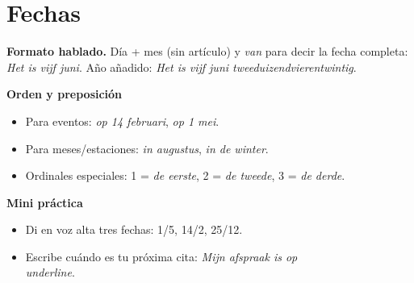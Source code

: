 \section{Fechas}
\textbf{Formato hablado.} Día + mes (sin artículo) y \textit{van} para decir la fecha completa: \textit{Het is vijf juni}. Año añadido: \textit{Het is vijf juni tweeduizendvierentwintig}.

\textbf{Orden y preposición}
\begin{itemize}[leftmargin=*]
  \item Para eventos: \textit{op 14 februari}, \textit{op 1 mei}.
  \item Para meses/estaciones: \textit{in augustus}, \textit{in de winter}.
  \item Ordinales especiales: 1 = \textit{de eerste}, 2 = \textit{de tweede}, 3 = \textit{de derde}.
\end{itemize}

\textbf{Mini práctica}
\begin{itemize}[leftmargin=*]
  \item Di en voz alta tres fechas: 1/5, 14/2, 25/12.
  \item Escribe cuándo es tu próxima cita: \textit{Mijn afspraak is op \\underline{\hspace{1.2cm}}}.
\end{itemize}
